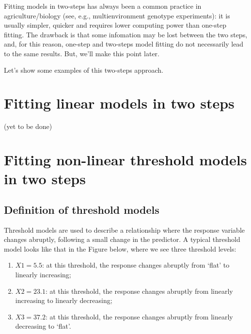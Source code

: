 \documentclass[
]{book}
\providecommand{\tightlist}{%
  \setlength{\itemsep}{0pt}\setlength{\parskip}{0pt}}
\begin{document}
Fitting models in two-steps has always been a common practice in agriculture/biology (see, e.g., multienvironment genotype experiments): it is usually simpler, quicker and requires lower computing power than one-step fitting. The drawback is that some infomation may be lost between the two steps, and, for this reason, one-step and two-steps model fitting do not necessarily lead to the same results. But, we'll make this point later.

Let's show some examples of this two-steps approach.

\hypertarget{fitting-linear-models-in-two-steps}{%
\section{Fitting linear models in two steps}\label{fitting-linear-models-in-two-steps}}

(yet to be done)

\hypertarget{fitting-non-linear-threshold-models-in-two-steps}{%
\section{Fitting non-linear threshold models in two steps}\label{fitting-non-linear-threshold-models-in-two-steps}}

\hypertarget{definition-of-threshold-models}{%
\subsection{Definition of threshold models}\label{definition-of-threshold-models}}

Threshold models are used to describe a relationship where the response variable changes abruptly, following a small change in the predictor. A typical threshold model looks like that in the Figure below, where we see three threshold levels:

\begin{enumerate}
\def\labelenumi{\arabic{enumi}.}
\tightlist
\item
  \(X1 = 5.5\): at this threshold, the response changes abruptly from `flat' to linearly increasing;
\item
  \(X2 = 23.1\): at this threshold, the response changes abruptly from linearly increasing to linearly decreasing;
\item
  \(X3 = 37.2\): at this threshold, the response changes abruptly from linearly decreasing to `flat'.
\end{enumerate}
\end{document}
